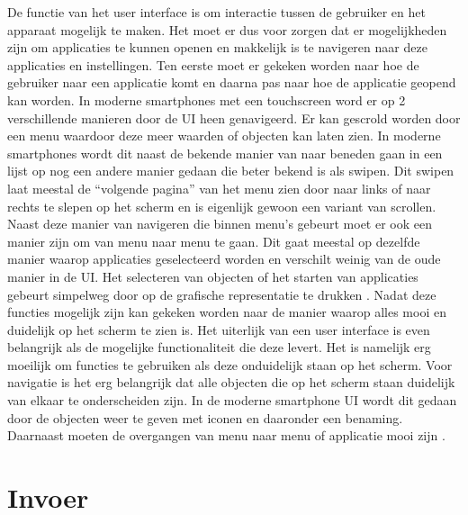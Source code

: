 De functie van het user interface is om interactie tussen de gebruiker en het apparaat mogelijk te maken.
Het moet er dus voor zorgen dat er mogelijkheden zijn om applicaties te kunnen openen en makkelijk is te navigeren naar deze applicaties en instellingen.
Ten eerste moet er gekeken worden naar hoe de gebruiker naar een applicatie komt en daarna pas naar hoe de applicatie geopend kan worden.
In moderne smartphones met een touchscreen word er op 2 verschillende manieren door de UI heen genavigeerd.
Er kan gescrold worden door een menu waardoor deze meer waarden of objecten kan laten zien.
In moderne smartphones wordt dit naast de bekende manier van naar beneden gaan in een lijst op nog een andere manier gedaan die beter bekend is als swipen.
Dit swipen laat meestal de ``volgende pagina'' van het menu zien door naar links of naar rechts te slepen op het scherm en is eigenlijk gewoon een variant van scrollen.
Naast deze manier van navigeren die binnen menu's gebeurt moet er ook een manier zijn om van menu naar menu te gaan.
Dit gaat meestal op dezelfde manier waarop applicaties geselecteerd worden en verschilt weinig van de oude manier in de UI.
Het selecteren van objecten of het starten van applicaties gebeurt simpelweg door op de grafische representatie te drukken \citep{guidelinesUI}.
Nadat deze functies mogelijk zijn kan gekeken worden naar de manier waarop alles mooi en duidelijk op het scherm te zien is.
Het uiterlijk van een user interface is even belangrijk als de mogelijke functionaliteit die deze levert.
Het is namelijk erg moeilijk om functies te gebruiken als deze onduidelijk staan op het scherm.
Voor navigatie is het erg belangrijk dat alle objecten die op het scherm staan duidelijk van elkaar te onderscheiden zijn.
In de moderne smartphone UI wordt dit gedaan door de objecten weer te geven met iconen en daaronder een benaming.
Daarnaast moeten de overgangen van menu naar menu of applicatie mooi zijn \citep{designUI}.

\section{Invoer}


